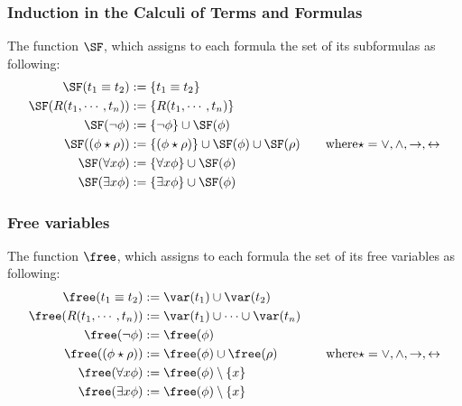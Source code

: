 \begin{frame}
    \frametitle{Induction in the Calculi of Terms and Formulas}

    \begin{definition}\label{def:subformulas}
        The function $\SF$, which assigns to each formula the set of its subformulas as following:
        \begin{align*}
            \SF(t_1 \equiv t_2) &:= \{t_1 \equiv t_2\} \\
            \SF(R(t_1, \cdots, t_n)) &:= \{R(t_1, \cdots, t_n)\} \\
            \SF(\neg \phi) &:= \{\neg \phi\} \cup \SF(\phi) \\
            \SF((\phi \star \rho)) &:= \{(\phi \star \rho)\} \cup \SF(\phi) \cup \SF(\rho) & \quad \text{where} \star = \vee, \wedge, \rightarrow, \leftrightarrow \\
            \SF(\forall x \phi) &:= \{\forall x \phi\} \cup \SF(\phi) \\
            \SF(\exists x \phi) &:= \{\exists x \phi\} \cup \SF(\phi)
        \end{align*}
    \end{definition}

\end{frame}

\begin{frame}
    \frametitle{Free variables}

    \begin{definition}\label{def:free}
        The function $\free$, which assigns to each formula the set of its free variables as following:
        \begin{align*}
            \free(t_1 \equiv t_2) &:= \var(t_1) \cup \var(t_2) \\
            \free(R(t_1, \cdots, t_n)) &:= \var(t_1) \cup \cdots \cup \var(t_n) \\
            \free(\neg \phi) &:= \free(\phi) \\
            \free((\phi \star \rho)) &:= \free(\phi) \cup \free(\rho) & \quad \text{where} \star = \vee, \wedge, \rightarrow, \leftrightarrow \\
            \free(\forall x \phi) &:= \free(\phi) \setminus \{x\} \\
            \free(\exists x \phi) &:= \free(\phi) \setminus \{x\}
        \end{align*}
    \end{definition}
\end{frame}

